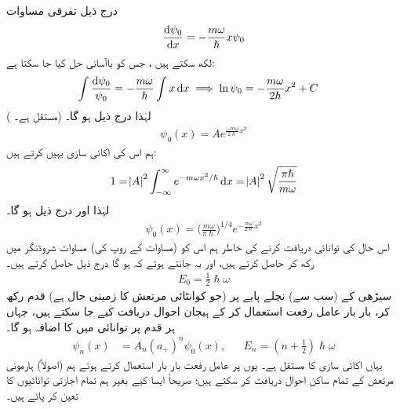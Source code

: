 درج ذیل تفرقی مساوات
\begin{align*}
\frac{ \dif \psi_0}{\dif x} = -\frac{m \omega}{ \hslash} x \psi_0
\end{align*}
لکھ سکتے ہیں ، جس کو باآسانی حل کیا جا سکتا ہے: 
\begin{align*}
\int{\frac{ \dif \psi_0}{ \psi_0}} &= -\frac{ m \omega}{ \hslash} \int{ x \dif x} \implies \ln \psi_0 = 
-\frac{m \omega}{ 2 \hslash} x^2 +C 
\end{align*} 
( مستقل ہے۔) لہٰذا درج ذیل ہو گا۔
\begin{align*}
\psi_0 (x) = A e^{\frac{ - m \omega}{ 2 \hslash} x^2}
\end{align*}
ہم اس کی اکائی سازی یہیں کرتے ہیں: 
\begin{align*}
1 = \abs{A}^2 \int_{ - \infty}^{ \infty} e^{- m \omega x^2/ \hslash} \dif x = \abs{A}^2 \sqrt{ \frac{ \pi \hslash}{ m \omega}}
\end{align*}
لہٰذا  اور درج ذیل ہو گا۔
\\
\begin{align}\label{مساوات_شروڈنگر_معمول_شدہ_حال_صفر}
\psi_0 (x) = \big(\frac{ m \omega}{ \pi \hslash}\big)^{1/4} e^{-\frac{ m \omega}{ 2 \hslash} x^2}
\end{align}
اس حال کی توانائی دریافت کرنے کی خاطر ہم اس کو (مساوات   کے روپ کی)   مساوات شروڈنگر میں  رکھ  کر   حاصل کرتے ہیں،  اور یہ جانتے ہوئے کہ  ہو گا درج ذیل حاصل کرتے ہیں۔
\begin{align}
 E_0 = \frac{1}{2} \hslash \omega 
\end{align}
سیڑھی کے (سب سے)  نچلے  پایے پر  (جو کوانٹائی مرتعش کا زمینی حال ہے)   قدم  رکھ کر، بار بار عامل رفعت استعمال کر کے ہیجان احوال دریافت کیے جا سکتے ہیں،  جہاں ہر قدم پر توانائی میں  کا اضافہ ہو گا۔
\begin{align}\label{مساوات_شروڈنگر_ہارمونی_حالات}
\psi_n (x) &= A_n ( a_+)^n \psi_0(x) , && E_n = ( n + \tfrac{1}{2}) \hslash \omega
\end{align}
یہاں    اکائی سازی  کا مستقل ہے۔ یوں  پر عامل رفعت بار بار استعمال کرتے ہوئے ہم (اصولاً) ہارمونی مرتعش کے تمام ساکن احوال دریافت کر سکتے ہیں؛  صریحاً ایسا کیے بغیر ہم تمام اجازتی توانائیوں کا تعین کر پائے ہیں۔




